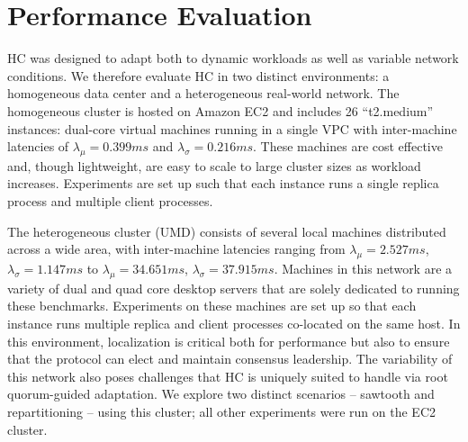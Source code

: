 \section{Performance Evaluation}
\label{ch03_evaluation}

HC was designed to adapt both to dynamic workloads as well as variable network conditions.
We therefore evaluate HC in two distinct environments: a homogeneous data center and a heterogeneous real-world network.
The homogeneous cluster is hosted on Amazon EC2 and includes 26 ``t2.medium'' instances: dual-core virtual machines running in a single VPC with inter-machine latencies of $\lambda_{\mu}=0.399ms$ and $\lambda_{\sigma}=0.216ms$.
These machines are cost effective and, though lightweight, are easy to scale to large cluster sizes as workload increases.
Experiments are set up such that each instance runs a single replica process and multiple client processes.

The heterogeneous cluster (UMD) consists of several local machines distributed across a wide area, with inter-machine latencies ranging from
$\lambda_{\mu}=2.527ms$,
$\lambda_{\sigma}=1.147ms$ to $\lambda_{\mu}=34.651ms$,
$\lambda_{\sigma}=37.915ms$.
Machines in this network are a variety of dual and quad core desktop servers that are solely dedicated to running these benchmarks.
Experiments on these machines are set up so that each instance runs multiple replica and client processes co-located on the same host.
In this environment, localization is critical both for performance but also to ensure that the protocol can elect and maintain consensus leadership.
The variability of this network also poses challenges that HC is uniquely suited to handle via root quorum-guided adaptation.
We explore two distinct scenarios -- sawtooth and repartitioning -- using this cluster; all other experiments were run on the EC2 cluster.

